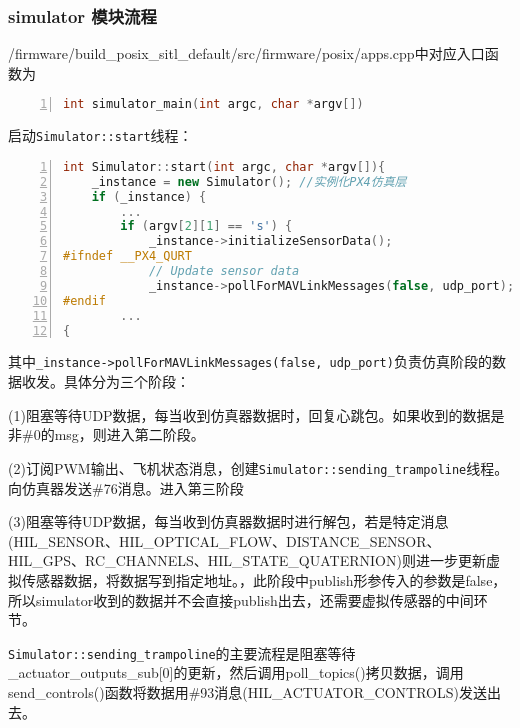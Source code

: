\subsubsection{simulator 模块流程}
\noindent 
/firmware/build_posix_sitl_default/src/firmware/posix/apps.cpp中对应入口函数为
\begin{lstlisting}[language=c++,numbers=left,firstnumber = 1,breaklines = true,numberstyle=\tiny,keywordstyle=\color{blue!70},commentstyle=\color{red!50!green!50!blue!50},frame=shadowbox, rulesepcolor=\color{red!20!green!20!blue!20}]
int simulator_main(int argc, char *argv[])
\end{lstlisting}
启动\texttt{Simulator::start}线程：
\begin{lstlisting}[language=c++,numbers=left,firstnumber = 1,breaklines = true,numberstyle=\tiny,keywordstyle=\color{blue!70},commentstyle=\color{red!50!green!50!blue!50},frame=shadowbox, rulesepcolor=\color{red!20!green!20!blue!20}]
int Simulator::start(int argc, char *argv[]){
	_instance = new Simulator(); //实例化PX4仿真层
	if (_instance) {
		...
		if (argv[2][1] == 's') {
			_instance->initializeSensorData();
#ifndef __PX4_QURT
			// Update sensor data
			_instance->pollForMAVLinkMessages(false, udp_port); 
#endif
		...
{\end{lstlisting}
其中\texttt{_instance->pollForMAVLinkMessages(false, udp_port)}负责仿真阶段的数据收发。具体分为三个阶段：

\noindent (1)阻塞等待UDP数据，每当收到仿真器数据时，回复心跳包。如果收到的数据是非\#0的msg，则进入第二阶段。

\noindent (2)订阅PWM输出、飞机状态消息，创建\texttt{Simulator::sending_trampoline}线程。向仿真器发送\#76消息。进入第三阶段

\noindent (3)阻塞等待UDP数据，每当收到仿真器数据时进行解包，若是特定消息(HIL_SENSOR、HIL_OPTICAL_FLOW、DISTANCE_SENSOR、HIL_GPS、RC_CHANNELS、HIL_STATE_QUATERNION)则进一步更新虚拟传感器数据，将数据写到指定地址。，此阶段中publish形参传入的参数是false，所以simulator收到的数据并不会直接publish出去，还需要虚拟传感器的中间环节。

\texttt{Simulator::sending_trampoline}的主要流程是阻塞等待_actuator_outputs_sub[0]的更新，然后调用poll_topics()拷贝数据，调用send_controls()函数将数据用\#93消息(HIL_ACTUATOR_CONTROLS)发送出去。

